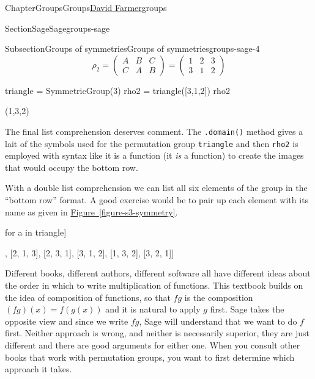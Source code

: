 \documentclass[oneside,10pt,]{book}
\newcommand{\xreffont}{\relax}
\newcommand{\mono}[1]{\texttt{#1}}
\numberwithin{equation}{section}
\begin{document}
\begin{chapterptx}{Chapter}{Groups}{}{Groups}{\hyperlink{dfarmer}{David Farmer}}{}{groups}
\begin{sectionptx}{Section}{Sage}{}{Sage}{}{}{groups-sage}
\begin{subsectionptx}{Subsection}{Groups of symmetries}{}{Groups of symmetries}{}{}{groups-sage-4}
\begin{equation*}
\rho_2=
\begin{pmatrix}
A & B & C\\
C & A & B
\end{pmatrix}
=
\begin{pmatrix}
1 & 2 & 3\\
3 & 1 & 2
\end{pmatrix}
\end{equation*}
%
\begin{sageinput}
triangle = SymmetricGroup(3)
rho2 = triangle([3,1,2])
rho2
\end{sageinput}
\begin{sageoutput}
(1,3,2)
\end{sageoutput}
\begin{sageinput}
\end{sageinput}
\begin{sageoutput}
[3, 1, 2]
\end{sageoutput}
The final list comprehension deserves comment.  The \mono{.domain()} method gives a lait of the symbols used for the permutation group \mono{triangle} and then \mono{rho2} is employed with syntax like it is a function (it \emph{is} a function) to create the images that would occupy the bottom row.%
\par
With a double list comprehension we can list all six elements of the group in the ``bottom row'' format.  A good exercise would be to pair up each element with its name as given in \hyperref[figure-s3-symmetry]{Figure~{\xreffont\ref{figure-s3-symmetry}}}.%
\begin{sageinput}
[[a(x) for x in triangle.domain()] for a in triangle]
\end{sageinput}
\begin{sageoutput}
[[1, 2, 3], [2, 1, 3], [2, 3, 1], [3, 1, 2], [1, 3, 2], [3, 2, 1]]
\end{sageoutput}
Different books, different authors, different software all have different ideas about the order in which to write multiplication of functions.  This textbook builds on the idea of composition of functions, so that \(fg\) is the composition \((fg)(x)=f(g(x))\) and it is natural to apply \(g\) first.  Sage takes the opposite view and since we write \(fg\), Sage will understand that we want to do \(f\) first.  Neither approach is wrong, and neither is necessarily superior, they are just different and there are good arguments for either one.  When you consult other books that work with permutation groups, you want to first determine which approach it takes.%

\end{subsectionptx}
\end{sectionptx}
\end{chapterptx}
\end{document}
